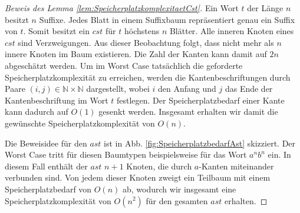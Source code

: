\documentclass[12pt]{report}
\begin{document}
\begin{proof}[Beweis des Lemma \ref{lem:SpeicherplatzkomplexitaetCst}]
Ein Wort $t$ der Länge $n$ besitzt $n$ Suffixe. Jedes Blatt in einem Suffixbaum repräsentiert genau ein Suffix von $t$. Somit besitzt ein $cst$ für $t$ höchstens $n$ Blätter. Alle inneren Knoten eines $cst$ sind Verzweigungen. Aus dieser Beobachtung folgt, dass nicht mehr als $n$ innere Knoten im Baum existieren. Die Zahl der Kanten kann damit auf $2n$ abgeschätzt werden. Um im Worst Case tatsächlich die geforderte Speicherplatzkomplexität zu erreichen, werden die Kantenbeschriftungen durch Paare $(i, j) \in \mathbb{N} \times \mathbb{N}$ dargestellt, wobei $i$ den Anfang und $j$ das Ende der Kantenbeschriftung im Wort $t$ festlegen. Der Speicherplatzbedarf einer Kante kann dadurch auf $O(1)$ gesenkt werden. Insgesamt erhalten wir damit die gewünschte Speicherplatzkomplexität von $O(n)$.

Die Beweisidee für den $ast$ ist in Abb. \ref{fig:SpeicherplatzbedarfAst} skizziert. Der Worst Case tritt für diesen Baumtypen beispielsweise für das Wort $a^nb^n$ ein. In diesem Fall enthält der $ast$ $n + 1$ Knoten, die durch $a$-Kanten miteinander verbunden sind. Von jedem dieser Knoten zweigt ein Teilbaum mit einem Speicherplatzbedarf von $O(n)$ ab, wodurch wir insgesamt eine Speicherplatzkomplexität von $O(n^2)$ für den gesamten $ast$ erhalten.


\end{proof}
\end{document}
